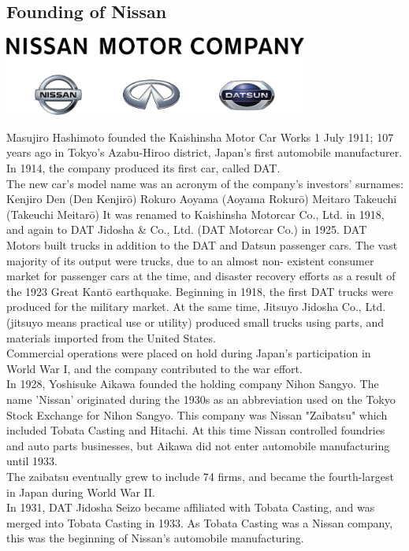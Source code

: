 \documentclass[11pt]{report}
\begin{document}
\subsection{Founding of Nissan}
\vspace{2mm}\begin{center}\includegraphics[width=10cm]{./img/nissanLogo.jpg}\end{center}
Masujiro Hashimoto founded the Kaishinsha Motor Car Works 1 July 1911; 107 years ago in Tokyo's Azabu-Hiroo district, Japan's first automobile manufacturer. In 1914, the company produced its first car, called DAT.\\
\indent The new car's model name was an acronym of the company's investors' surnames:\\
Kenjiro Den (Den Kenjirō)
Rokuro Aoyama (Aoyama Rokurō)
Meitaro Takeuchi (Takeuchi Meitarō)
It was renamed to Kaishinsha Motorcar Co., Ltd. in 1918, and again to DAT Jidosha \& Co., Ltd. (DAT Motorcar Co.) in 1925. DAT Motors built trucks in addition to the DAT and Datsun passenger cars. The vast majority of its output were trucks, due to an almost non- existent consumer market for passenger cars at the time, and disaster recovery efforts as a result of the 1923 Great Kantō earthquake. Beginning in 1918, the first DAT trucks were produced for the military market. At the same time, Jitsuyo Jidosha Co., Ltd. (jitsuyo means practical use or utility) produced small trucks using parts, and materials imported from the United States.\\
\indent Commercial operations were placed on hold during Japan's participation in World War I, and the company contributed to the war effort.\\
\indent In 1928, Yoshisuke Aikawa founded the holding company Nihon Sangyo. The name 'Nissan' originated during the 1930s as an abbreviation used on the Tokyo Stock Exchange for Nihon Sangyo. This company was Nissan "Zaibatsu" which included Tobata Casting and Hitachi. At this time Nissan controlled foundries and auto parts businesses, but Aikawa did not enter automobile manufacturing until 1933.\\
The zaibatsu eventually grew to include 74 firms, and became the fourth-largest in Japan during World War II.\\
In 1931, DAT Jidosha Seizo became affiliated with Tobata Casting, and was merged into Tobata Casting in 1933. As Tobata Casting was a Nissan company, this was the beginning of Nissan's automobile manufacturing.
\end{document}
